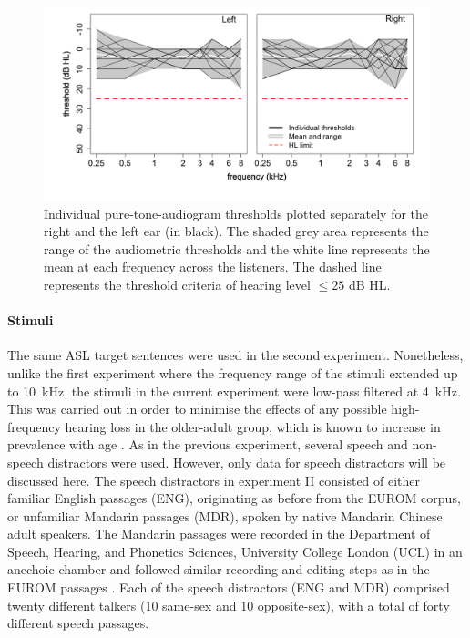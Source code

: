 \documentclass[a4paper, twoside]{templates/ociamthesis}
\begin{document}
\begin{figure}[ht]
\center
\includegraphics[width=\textwidth]{figures/Chapt1/Exp2_PTA.PNG}
\caption{\label{fig:PTA_Exp2}{Individual pure-tone-audiogram thresholds plotted separately for the right and the left ear (in black). The shaded grey area represents the range of the audiometric thresholds and the white line represents the mean at each frequency across the listeners. The dashed line represents the threshold criteria of hearing level $\leq 25$ dB HL.}}
\end{figure}

\hypertarget{stimuli-1}{%
\paragraph{Stimuli}\label{stimuli-1}}

\hfill\break
The same ASL target sentences were used in the second experiment. Nonetheless, unlike the first experiment where the frequency range of the stimuli extended up to 10~kHz, the stimuli in the current experiment were low-pass filtered at 4~kHz. This was carried out in order to minimise the effects of any possible high-frequency hearing loss in the older-adult group, which is known to increase in prevalence with age \autocite[e.g.,][]{Brant1990}. As in the previous experiment, several speech and non-speech distractors were used. However, only data for speech distractors will be discussed here. The speech distractors in experiment II consisted of either familiar English passages (ENG), originating as before from the EUROM corpus, or unfamiliar Mandarin passages (MDR), spoken by native Mandarin Chinese adult speakers. The Mandarin passages were recorded in the Department of Speech, Hearing, and Phonetics Sciences, University College London (UCL) in an anechoic chamber and followed similar recording and editing steps as in the EUROM passages \autocite{Chan1995}. Each of the speech distractors (ENG and MDR) comprised twenty different talkers (10 same-sex and 10 opposite-sex), with a total of forty different speech passages.\\
\end{document}
